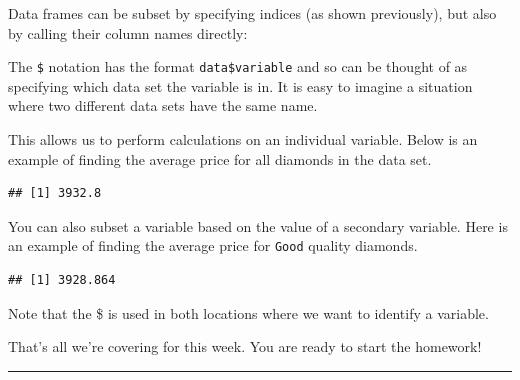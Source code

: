 \documentclass[
]{article}
\newenvironment{Shaded}{\begin{snugshade}}{\end{snugshade}}
\newcommand{\DecValTok}[1]{\textcolor[rgb]{0.00,0.00,0.81}{#1}}
\newcommand{\KeywordTok}[1]{\textcolor[rgb]{0.13,0.29,0.53}{\textbf{#1}}}
\newcommand{\NormalTok}[1]{#1}
\newcommand{\OperatorTok}[1]{\textcolor[rgb]{0.81,0.36,0.00}{\textbf{#1}}}
\newcommand{\StringTok}[1]{\textcolor[rgb]{0.31,0.60,0.02}{#1}}
\begin{document}
Data frames can be subset by specifying indices (as shown previously),
but also by calling their column names directly:

\begin{Shaded}
\end{Shaded}

The \texttt{\$} notation has the format \texttt{data\$variable} and so
can be thought of as specifying which data set the variable is in. It is
easy to imagine a situation where two different data sets have the same
name.

This allows us to perform calculations on an individual variable. Below
is an example of finding the average price for all diamonds in the data
set.

\begin{Shaded}
\end{Shaded}

\begin{verbatim}
## [1] 3932.8
\end{verbatim}

You can also subset a variable based on the value of a secondary
variable. Here is an example of finding the average price for
\texttt{Good} quality diamonds.

\begin{Shaded}
\end{Shaded}

\begin{verbatim}
## [1] 3928.864
\end{verbatim}

Note that the \$ is used in both locations where we want to identify a
variable.

That's all we're covering for this week. You are ready to start the
homework!

\begin{center}\rule{0.5\linewidth}{0.5pt}\end{center}
\end{document}
